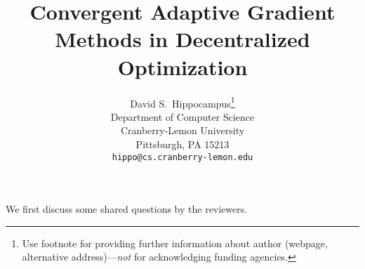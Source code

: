 \documentclass{article} %
\title{Convergent Adaptive Gradient Methods in Decentralized Optimization\vspace{-0.15in}}
\begin{document}
\maketitle


\author{%
  David S.~Hippocampus\thanks{Use footnote for providing further information
    about author (webpage, alternative address)---\emph{not} for acknowledging
    funding agencies.} \\
  Department of Computer Science\\
  Cranberry-Lemon University\\
  Pittsburgh, PA 15213 \\
  \texttt{hippo@cs.cranberry-lemon.edu} \\
}



We first discuss some shared questions  by the reviewers.
\vspace{-2pt}
\end{document}
